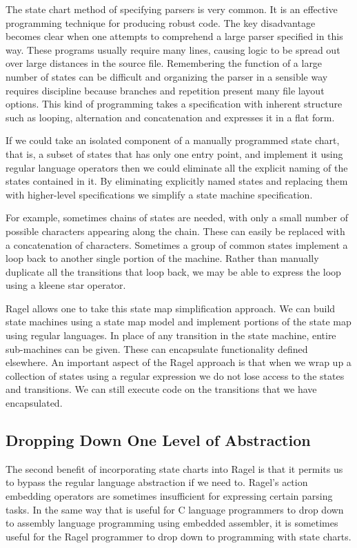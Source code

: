\documentclass[letterpaper,11pt,oneside]{book}
\begin{document}
The state chart method of specifying parsers is very common.  It is an
effective programming technique for producing robust code. The key disadvantage
becomes clear when one attempts to comprehend a large parser specified in this
way.  These programs usually require many lines, causing logic to be spread out
over large distances in the source file. Remembering the function of a large
number of states can be difficult and organizing the parser in a sensible way
requires discipline because branches and repetition present many file layout
options.  This kind of programming takes a specification with inherent
structure such as looping, alternation and concatenation and expresses it in a
flat form. 

If we could take an isolated component of a manually programmed state chart,
that is, a subset of states that has only one entry point, and implement it
using regular language operators then we could eliminate all the explicit
naming of the states contained in it. By eliminating explicitly named states
and replacing them with higher-level specifications we simplify a state machine
specification.

For example, sometimes chains of states are needed, with only a small number of
possible characters appearing along the chain. These can easily be replaced
with a concatenation of characters. Sometimes a group of common states
implement a loop back to another single portion of the machine. Rather than
manually duplicate all the transitions that loop back, we may be able to
express the loop using a kleene star operator.

Ragel allows one to take this state map simplification approach. We can build
state machines using a state map model and implement portions of the state map
using regular languages. In place of any transition in the state machine,
entire sub-machines can be given. These can encapsulate functionality
defined elsewhere. An important aspect of the Ragel approach is that when we
wrap up a collection of states using a regular expression we do not lose
access to the states and transitions. We can still execute code on the
transitions that we have encapsulated.

\subsection{Dropping Down One Level of Abstraction}
\label{down}

The second benefit of incorporating state charts into Ragel is that it permits
us to bypass the regular language abstraction if we need to. Ragel's action
embedding operators are sometimes insufficient for expressing certain parsing
tasks.  In the same way that is useful for C language programmers to drop down
to assembly language programming using embedded assembler, it is sometimes
useful for the Ragel programmer to drop down to programming with state charts.
\end{document}
